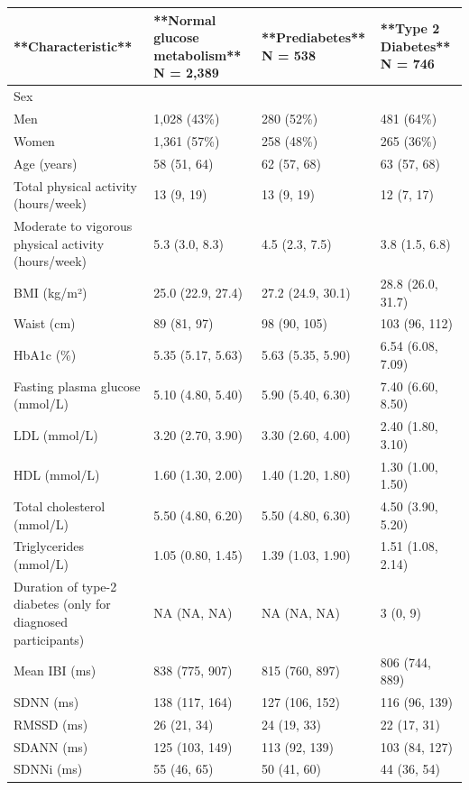 \documentclass[
  a4paper,
  headsepline=true,
  open=any]{scrbook}
\begin{document}
\begin{table}
\centering
\begin{tabular}{l|l|l|l}
\hline
**Characteristic** & **Normal glucose metabolism**  
N = 2,389 & **Prediabetes**  
N = 538 & **Type 2 Diabetes**  
N = 746\\
\hline
Sex &  &  & \\
\hline
Men & 1,028 (43\%) & 280 (52\%) & 481 (64\%)\\
\hline
Women & 1,361 (57\%) & 258 (48\%) & 265 (36\%)\\
\hline
Age (years) & 58 (51, 64) & 62 (57, 68) & 63 (57, 68)\\
\hline
Total physical activity (hours/week) & 13 (9, 19) & 13 (9, 19) & 12 (7, 17)\\
\hline
Moderate to vigorous physical activity (hours/week) & 5.3 (3.0, 8.3) & 4.5 (2.3, 7.5) & 3.8 (1.5, 6.8)\\
\hline
BMI (kg/m²) & 25.0 (22.9, 27.4) & 27.2 (24.9, 30.1) & 28.8 (26.0, 31.7)\\
\hline
Waist (cm) & 89 (81, 97) & 98 (90, 105) & 103 (96, 112)\\
\hline
HbA1c (\%) & 5.35 (5.17, 5.63) & 5.63 (5.35, 5.90) & 6.54 (6.08, 7.09)\\
\hline
Fasting plasma glucose (mmol/L) & 5.10 (4.80, 5.40) & 5.90 (5.40, 6.30) & 7.40 (6.60, 8.50)\\
\hline
LDL (mmol/L) & 3.20 (2.70, 3.90) & 3.30 (2.60, 4.00) & 2.40 (1.80, 3.10)\\
\hline
HDL (mmol/L) & 1.60 (1.30, 2.00) & 1.40 (1.20, 1.80) & 1.30 (1.00, 1.50)\\
\hline
Total cholesterol (mmol/L) & 5.50 (4.80, 6.20) & 5.50 (4.80, 6.30) & 4.50 (3.90, 5.20)\\
\hline
Triglycerides (mmol/L) & 1.05 (0.80, 1.45) & 1.39 (1.03, 1.90) & 1.51 (1.08, 2.14)\\
\hline
Duration of type-2 diabetes (only for diagnosed participants) & NA (NA, NA) & NA (NA, NA) & 3 (0, 9)\\
\hline
Mean IBI (ms) & 838 (775, 907) & 815 (760, 897) & 806 (744, 889)\\
\hline
SDNN (ms) & 138 (117, 164) & 127 (106, 152) & 116 (96, 139)\\
\hline
RMSSD (ms) & 26 (21, 34) & 24 (19, 33) & 22 (17, 31)\\
\hline
SDANN (ms) & 125 (103, 149) & 113 (92, 139) & 103 (84, 127)\\
\hline
SDNNi (ms) & 55 (46, 65) & 50 (41, 60) & 44 (36, 54)\\

\end{tabular}
\end{table}
\end{document}
